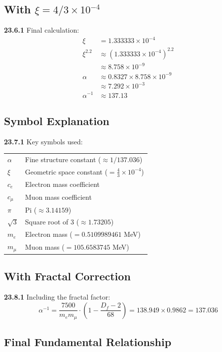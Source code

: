 \subsection{With $\xi = 4/3 \times 10^{-4}$}
\noindent \textbf{23.6.1} Final calculation:
\begin{align}
	\xi &= 1.333333 \times 10^{-4} \\
	\xi^{2.2} &\approx (1.333333 \times 10^{-4})^{2.2} \\
	&\approx 8.758 \times 10^{-9} \\
	\alpha &\approx 0.8327 \times 8.758 \times 10^{-9} \\
	&\approx 7.292 \times 10^{-3} \\
	\alpha^{-1} &\approx 137.13
\end{align}

\subsection{Symbol Explanation}

\noindent \textbf{23.7.1} Key symbols used:

\begin{tabular}{ll}
	$\alpha$ & Fine structure constant ($\approx 1/137.036$) \\
	$\xi$ & Geometric space constant ($= \frac{4}{3} \times 10^{-4}$) \\
	$c_e$ & Electron mass coefficient \\
	$c_\mu$ & Muon mass coefficient \\
	$\pi$ & Pi ($\approx 3.14159$) \\
	$\sqrt{3}$ & Square root of 3 ($\approx 1.73205$) \\
	$m_e$ & Electron mass ($= 0.5109989461$ MeV) \\
	$m_\mu$ & Muon mass ($= 105.6583745$ MeV) \\
\end{tabular}

\subsection{With Fractal Correction}

\noindent \textbf{23.8.1} Including the fractal factor:
\[
\alpha^{-1} = \frac{7500}{m_e m_\mu} \cdot \left(1 - \frac{D_f - 2}{68}\right) = 138.949 \times 0.9862 = 137.036
\]

\subsection{Final Fundamental Relationship}

